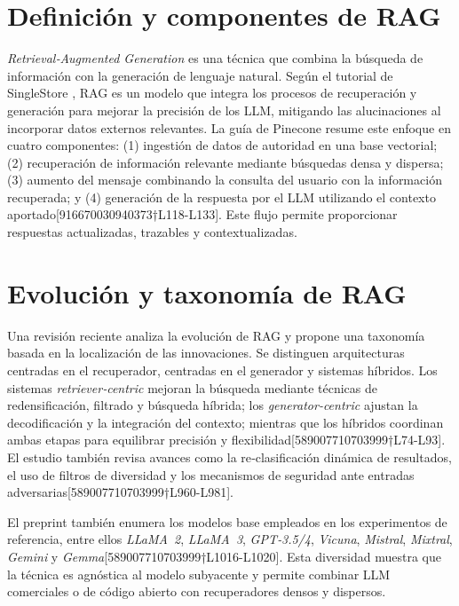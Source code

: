 \section{Definición y componentes de RAG}

\textit{Retrieval‑Augmented Generation} es una técnica que combina la búsqueda de información con la generación de lenguaje natural.  Según el tutorial de SingleStore \cite{singlestore2025tutorial}, RAG es un modelo que integra los procesos de recuperación y generación para mejorar la precisión de los LLM, mitigando las alucinaciones al incorporar datos externos relevantes.  La guía de Pinecone resume este enfoque en cuatro componentes: (1) ingestión de datos de autoridad en una base vectorial; (2) recuperación de información relevante mediante búsquedas densa y dispersa; (3) aumento del mensaje combinando la consulta del usuario con la información recuperada; y (4) generación de la respuesta por el LLM utilizando el contexto aportado[916670030940373†L118-L133].  Este flujo permite proporcionar respuestas actualizadas, trazables y contextualizadas.

\section{Evolución y taxonomía de RAG}

Una revisión reciente \cite{sharma2025survey} analiza la evolución de RAG y propone una taxonomía basada en la localización de las innovaciones.  Se distinguen arquitecturas centradas en el recuperador, centradas en el generador y sistemas híbridos.  Los sistemas \emph{retriever‑centric} mejoran la búsqueda mediante técnicas de redensificación, filtrado y búsqueda híbrida; los \emph{generator‑centric} ajustan la decodificación y la integración del contexto; mientras que los híbridos coordinan ambas etapas para equilibrar precisión y flexibilidad[589007710703999†L74-L93].  El estudio también revisa avances como la re‑clasificación dinámica de resultados, el uso de filtros de diversidad y los mecanismos de seguridad ante entradas adversarias[589007710703999†L960-L981].

El preprint también enumera los modelos base empleados en los experimentos de referencia, entre ellos \textit{LLaMA 2}, \textit{LLaMA 3}, \textit{GPT‑3.5/4}, \textit{Vicuna}, \textit{Mistral}, \textit{Mixtral}, \textit{Gemini} y \textit{Gemma}[589007710703999†L1016-L1020].  Esta diversidad muestra que la técnica es agnóstica al modelo subyacente y permite combinar LLM comerciales o de código abierto con recuperadores densos y dispersos.

